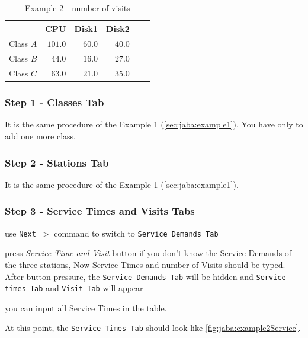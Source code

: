 \begin{table}[htbp]
\begin{center}
\begin{tabular}{c|r|r|r|r|r|}
& \multicolumn{1}{c|}{CPU} & \multicolumn{1}{c|}{Disk1} & \multicolumn{1}{c|}{Disk2} \\
\hline
Class $A$ & $101.0$ & $60.0$ & $40.0$ \\
Class $B$ & $44.0$ & $16.0$ & $27.0$ \\
Class $C$ & $63.0$ & $21.0$ & $35.0$ \\
\hline
\end{tabular}
\end{center}
\caption{Example 2 - number of visits}
\label{tab:jaba:example2Visits}
\end{table}


\subsubsection{Step 1 - Classes Tab}
It is the same procedure of the Example 1 (\autoref{sec:jaba:example1}). You have only to add one more class.
\subsubsection{Step 2 - Stations Tab}
It is the same procedure of the Example 1 (\autoref{sec:jaba:example1}).
\subsubsection{Step 3 - Service Times and Visits Tabs}
\begin{itemize*}
\item use \texttt{Next $>$} command to switch to \texttt{Service Demands Tab}
\item press \emph{Service Time and Visit} button if you don't know
the Service Demands of the three stations, Now Service
Times and number of Visits should be typed. After button pressure,
the \texttt{Service Demands Tab} will be hidden and \texttt{Service
times Tab} and \texttt{Visit Tab} will appear
\item you can input all Service Times in the table.
\end{itemize*}

At this point, the \texttt{Service Times Tab} should look like
\autoref{fig:jaba:example2Service}.

